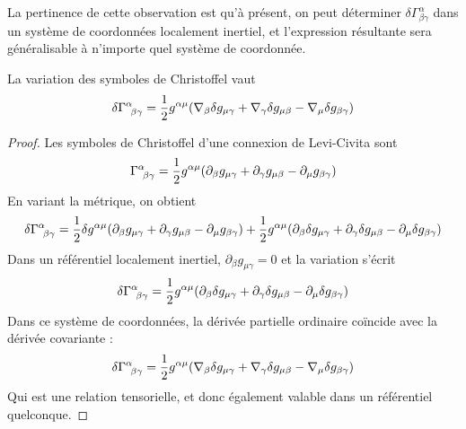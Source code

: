 La pertinence de cette observation est qu'à présent, on peut déterminer $\delta \Gamma^{\alpha}_{\!\beta \gamma}$ dans un système de coordonnées localement inertiel, et l'expression résultante sera généralisable à n'importe quel système de coordonnée. 
\begin{theoremframe}
    \begin{propri}
        La variation des symboles de Christoffel vaut
        \begin{equation}
        \delta \Gamma\indices{^{\alpha}_{\!\beta \gamma}} = \frac{1}{2}g^{\alpha \mu}(\nabla_{\beta} \delta g_{ \mu \gamma} + \nabla_{\gamma} \delta g_{\mu\beta} - \nabla_{\mu} \delta g_{\beta \gamma})
        \end{equation}
    \end{propri}    
\end{theoremframe}
\begin{proof}
    Les symboles de Christoffel d'une connexion de Levi-Civita sont
    \begin{equation}
        \Gamma\indices{^{\alpha}_{\!\beta \gamma}} = \frac{1}{2}g^{\alpha \mu}(\partial_{\beta} g_{ \mu \gamma} + \partial_{\gamma}g_{\mu\beta} - \partial_{\mu}g_{\beta \gamma})
    \end{equation}
    En variant la métrique, on obtient
    \begin{equation}
        \delta \Gamma\indices{^{\alpha}_{\!\beta \gamma}} = \frac{1}{2}\delta g^{\alpha \mu}(\partial_{\beta} g_{ \mu \gamma} + \partial_{\gamma}g_{\mu\beta} - \partial_{\mu}g_{\beta \gamma}) + \frac{1}{2}g^{\alpha \mu}(\partial_{\beta} \delta g_{ \mu \gamma} + \partial_{\gamma} \delta g_{\mu\beta} - \partial_{\mu} \delta g_{\beta \gamma})
    \end{equation}
    Dans un référentiel localement inertiel, $\partial_{\beta} g_{ \mu \gamma} = 0$ et la variation s'écrit
    \begin{equation}
        \delta \Gamma\indices{^{\alpha}_{\!\beta \gamma}} = \frac{1}{2}g^{\alpha \mu}(\partial_{\beta} \delta g_{ \mu \gamma} + \partial_{\gamma} \delta g_{\mu\beta} - \partial_{\mu} \delta g_{\beta \gamma})
    \end{equation}
    Dans ce système de coordonnées, la dérivée partielle ordinaire coïncide avec la dérivée covariante :
    \begin{equation}
        \delta \Gamma\indices{^{\alpha}_{\!\beta \gamma}} = \frac{1}{2}g^{\alpha \mu}(\nabla_{\beta} \delta g_{ \mu \gamma} + \nabla_{\gamma} \delta g_{\mu\beta} - \nabla_{\mu} \delta g_{\beta \gamma})
    \end{equation}
    Qui est une relation tensorielle, et donc également valable dans un référentiel quelconque.
\end{proof}
